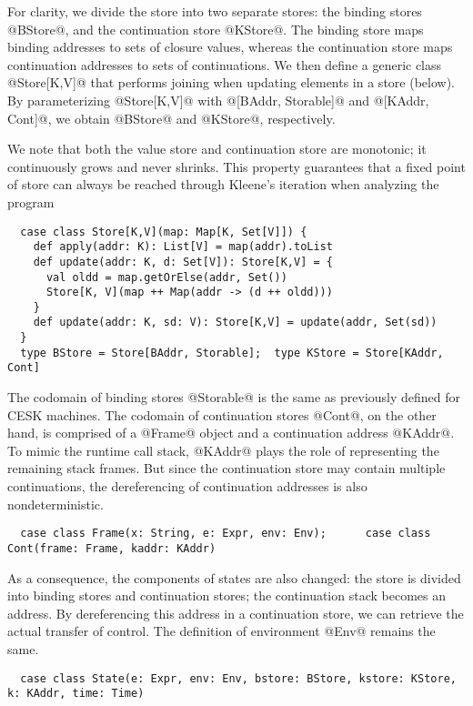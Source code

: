 \documentclass[acmsmall, review]{acmart}\settopmatter{}
\begin{document}
For clarity, we divide the store into two separate stores: the binding stores @BStore@, and
the continuation store @KStore@.
The binding store maps binding addresses to sets of closure values, whereas the continuation
store maps continuation addresses to sets of continuations.
We then define a generic class @Store[K,V]@ that performs joining when updating elements
in a store (below). By parameterizing @Store[K,V]@ with @[BAddr, Storable]@ and
@[KAddr, Cont]@, we obtain @BStore@ and @KStore@, respectively.

We note that both the value store and continuation store are monotonic;
it continuously grows and never shrinks. This property guarantees that
a fixed point of store can always be reached through Kleene's
iteration when analyzing the program

\begin{lstlisting}
  case class Store[K,V](map: Map[K, Set[V]]) {
    def apply(addr: K): List[V] = map(addr).toList
    def update(addr: K, d: Set[V]): Store[K,V] = {
      val oldd = map.getOrElse(addr, Set())
      Store[K, V](map ++ Map(addr -> (d ++ oldd)))
    }
    def update(addr: K, sd: V): Store[K,V] = update(addr, Set(sd))
  }
  type BStore = Store[BAddr, Storable];  type KStore = Store[KAddr, Cont]
\end{lstlisting}

The codomain of binding stores @Storable@ is the same as previously defined for CESK 
machines. The codomain of continuation stores @Cont@, on the other hand, is comprised of
a @Frame@ object and a continuation address @KAddr@. To mimic the runtime call stack, 
@KAddr@ plays the role of representing the remaining stack frames.
But since the continuation store may contain multiple continuations, the dereferencing 
of continuation addresses is also nondeterministic.

\begin{lstlisting}
  case class Frame(x: String, e: Expr, env: Env);      case class Cont(frame: Frame, kaddr: KAddr)
\end{lstlisting}

As a consequence, the components of states are also changed: the store is divided
into binding stores and continuation stores; the continuation stack becomes an address.
By dereferencing this address in a continuation store, we can retrieve the actual 
transfer of control. The definition of environment @Env@ remains the same.

\begin{lstlisting}
  case class State(e: Expr, env: Env, bstore: BStore, kstore: KStore, k: KAddr, time: Time)
\end{lstlisting}
\end{document}
